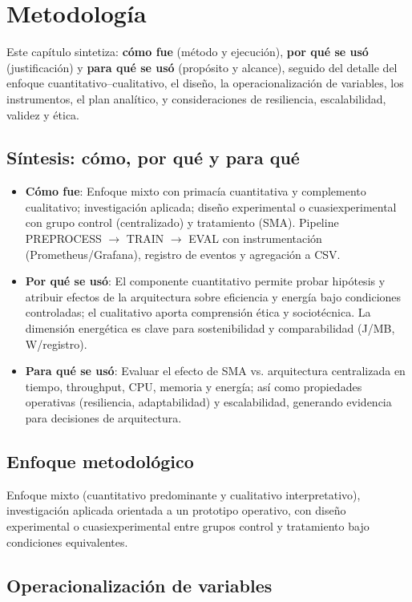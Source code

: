 \chapter{Metodología}
\label{chap:metodologia}

Este capítulo sintetiza: \textbf{cómo fue} (método y ejecución), \textbf{por qué se usó} (justificación) y \textbf{para qué se usó} (propósito y alcance), seguido del detalle del enfoque cuantitativo--cualitativo, el diseño, la operacionalización de variables, los instrumentos, el plan analítico, y consideraciones de resiliencia, escalabilidad, validez y ética.

\section{Síntesis: cómo, por qué y para qué}
\begin{itemize}
  \item \textbf{Cómo fue}: Enfoque mixto con primacía cuantitativa y complemento cualitativo; investigación aplicada; diseño experimental o cuasiexperimental con grupo control (centralizado) y tratamiento (SMA). Pipeline PREPROCESS $\to$ TRAIN $\to$ EVAL con instrumentación (Prometheus/Grafana), registro de eventos y agregación a CSV.
  \item \textbf{Por qué se usó}: El componente cuantitativo permite probar hipótesis y atribuir efectos de la arquitectura sobre eficiencia y energía bajo condiciones controladas; el cualitativo aporta comprensión ética y sociotécnica. La dimensión energética es clave para sostenibilidad y comparabilidad (J/MB, W/registro).
  \item \textbf{Para qué se usó}: Evaluar el efecto de SMA vs. arquitectura centralizada en tiempo, throughput, CPU, memoria y energía; así como propiedades operativas (resiliencia, adaptabilidad) y escalabilidad, generando evidencia para decisiones de arquitectura.
\end{itemize}

\section{Enfoque metodológico}
Enfoque mixto (cuantitativo predominante y cualitativo interpretativo), investigación aplicada orientada a un prototipo operativo, con diseño experimental o cuasiexperimental entre grupos control y tratamiento bajo condiciones equivalentes.

\section{Operacionalización de variables}
